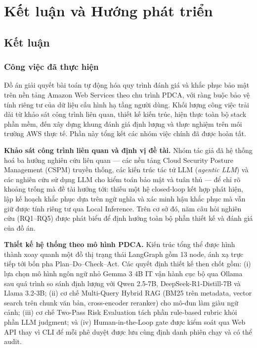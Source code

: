 \chapter{Kết luận và Hướng phát triển}

\section{Kết luận}
\label{sec:conclusion}

\subsection{Công việc đã thực hiện}
\label{subsec:summary-work}

Đồ án giải quyết bài toán tự động hóa quy trình đánh giá và khắc phục bảo mật trên nền tảng Amazon Web Services theo chu trình PDCA, với ràng buộc bảo vệ tính riêng tư của dữ liệu cấu hình hạ tầng người dùng. Khối lượng công việc trải dài từ khảo sát công trình liên quan, thiết kế kiến trúc, hiện thực toàn bộ stack phần mềm, đến xây dựng khung đánh giá định lượng và thực nghiệm trên môi trường AWS thực tế. Phần này tổng kết các nhóm việc chính đã được hoàn tất.

\textbf{Khảo sát công trình liên quan và định vị đề tài.} Nhóm tác giả đã hệ thống hoá ba hướng nghiên cứu liên quan --- các nền tảng Cloud Security Posture Management (CSPM) truyền thống, các kiến trúc tác tử LLM (\textit{agentic LLM}) và các nghiên cứu sử dụng LLM cho kiểm toán bảo mật và tuân thủ --- để chỉ rõ khoảng trống mà đề tài hướng tới: thiếu một hệ closed-loop kết hợp phát hiện, lập kế hoạch khắc phục dựa trên ngữ nghĩa và xác minh hậu khắc phục mà vẫn giữ được tính riêng tư qua Local Inference. Trên cơ sở đó, năm câu hỏi nghiên cứu (RQ1--RQ5) được phát biểu để định hướng toàn bộ phần thiết kế và đánh giá của đồ án.

\textbf{Thiết kế hệ thống theo mô hình PDCA.} Kiến trúc tổng thể được hình thành xoay quanh một đồ thị trạng thái LangGraph gồm 13 node, ánh xạ trực tiếp tới bốn pha Plan--Do--Check--Act. Các quyết định thiết kế then chốt gồm: (i) lựa chọn mô hình ngôn ngữ nhỏ Gemma 3 4B IT vận hành cục bộ qua Ollama sau quá trình so sánh định lượng với Qwen 2.5-7B, DeepSeek-R1-Distill-7B và Llama 3.2-3B; (ii) cơ chế Multi-Query Hybrid RAG (BM25 trên metadata, vector search trên chunk văn bản, cross-encoder reranker) cho mô-đun làm giàu ngữ cảnh; (iii) cơ chế Two-Pass Risk Evaluation tách phần rule-based rubric khỏi phần LLM judgment; và (iv) Human-in-the-Loop gate được kiểm soát qua Web API thay vì CLI để mỗi phê duyệt được lưu cùng định danh phiên chạy và có thể audit.

